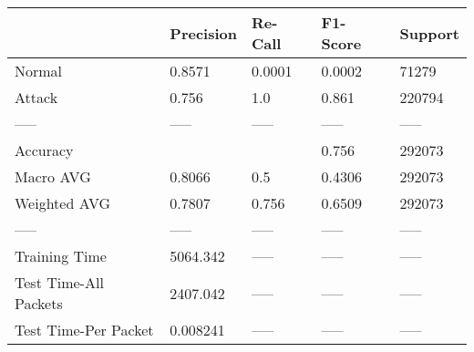 \begin{tabular}{lllll}
\toprule
{} & Precision & Re-Call & F1-Score & Support \\
\midrule
Normal                &    0.8571 &  0.0001 &   0.0002 &   71279 \\
Attack                &     0.756 &     1.0 &    0.861 &  220794 \\
-----                 &     ----- &   ----- &    ----- &   ----- \\
Accuracy              &           &         &    0.756 &  292073 \\
Macro AVG             &    0.8066 &     0.5 &   0.4306 &  292073 \\
Weighted AVG          &    0.7807 &   0.756 &   0.6509 &  292073 \\
-----                 &     ----- &   ----- &    ----- &   ----- \\
Training Time         &  5064.342 &   ----- &    ----- &   ----- \\
Test Time-All Packets &  2407.042 &   ----- &    ----- &   ----- \\
Test Time-Per Packet  &  0.008241 &   ----- &    ----- &   ----- \\
\bottomrule
\end{tabular}
